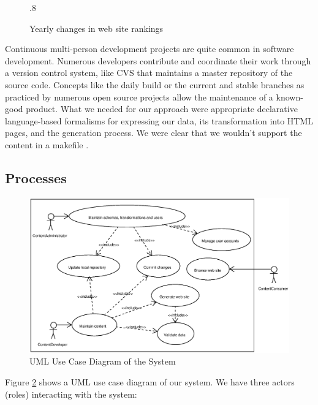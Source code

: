 \documentclass[10pt]{article}
\def\epsfsize#1#2{\ifdim#1>\columnwidth\columnwidth\else#1\fi}
\begin{document}
\label{sec:design}
\begin{figure}[h!]
\begin{center}
\leavevmode
\def\epsfsize#1#2{\epsfxsize}
\epsfysize.8\vsize
{}
\end{center}
\caption{Yearly changes in web site rankings}
\label{fig:rankyear}
\end{figure}

Continuous multi-person development projects are quite
common in software development.
Numerous developers contribute and coordinate their work
through a version control system, like {\sc CVS} that
maintains a master repository of the source code.
Concepts like the daily build \cite{CS95b} or the
current and stable branches as practiced by
numerous open source projects allow the maintenance
of a known-good product.
What we needed for our approach were appropriate
declarative language-based formalisms for expressing our data,
its transformation into {\sc HTML} pages, and the
generation process. We were clear that we wouldn't support the content in a makefile \cite{OTT91}.

\subsection{Processes}

\begin{figure}[h!]
\includegraphics[scale=0.5]{use-case-diagram}
\caption{UML Use Case Diagram of the System}
\label{fig:use-case-diagram}
\end{figure}

Figure \ref{fig:use-case-diagram} shows a {\sc UML} \cite{UML} use case diagram of our system. 
We have three actors (roles) interacting with the system:
\end{document}

